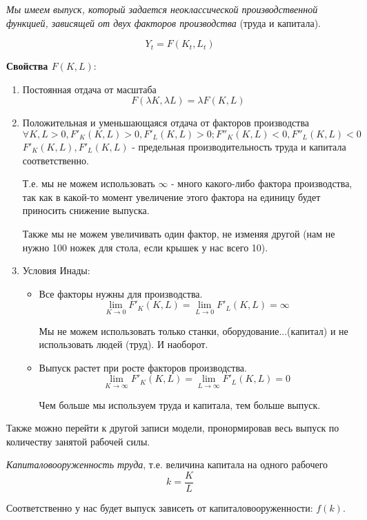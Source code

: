 \documentclass[reqno]{article}
\theoremstyle{definition}
\theoremstyle{definition}
\theoremstyle{definition}
\theoremstyle{definition}
\theoremstyle{definition}
\theoremstyle{definition}
\theoremstyle{definition}
\theoremstyle{definition}
\theoremstyle{definition}
\begin{document}
		\emph{Мы имеем выпуск, который задается неоклассической производственной функцией, зависящей от двух факторов производства} (труда и капитала). 
		
		$$Y_t=F(K_t,L_t)$$
		
		\textbf{Свойства $F(K,L)$}:
		\begin{enumerate}
			\item Постоянная отдача от масштаба 
			$$F(\lambda K, \lambda L) = \lambda F(K, L)$$
			
			\item Положительная и уменьшающаяся отдача от факторов производства
			$$\forall K,L > 0, F'_K (K, L) > 0, F'_L (K, L) > 0; F''_K (K, L) < 0, F''_L (K, L) < 0 $$
			$F'_K (K, L), F'_L (K, L)$ - предельная производительность труда и капитала соответственно.
			
			Т.е. мы не можем использовать $\infty$ - много какого-либо фактора производства, так как в какой-то момент увеличение этого фактора на единицу будет приносить снижение выпуска.
			
			Также мы не можем увеличивать один фактор, не изменяя другой (нам не нужно 100 ножек для стола, если крышек у нас всего 10).
			
			\item Условия Инады:
			\begin{itemize}
				\item Все факторы нужны для производства.
				$$\lim_{K \rightarrow 0} F'_K (K, L) = \lim_{L \rightarrow 0} F'_L (K, L) = \infty$$
				
				Мы не можем использовать только станки, оборудование...(капитал) и не использовать людей (труд). И наоборот.
				
				\item Выпуск растет при росте факторов производства.
				$$\lim_{K \rightarrow \infty} F'_K (K, L) = \lim_{L \rightarrow \infty} F'_L (K, L) = 0$$
				
				Чем больше мы используем труда и капитала, тем больше выпуск.
			\end{itemize}
		\end{enumerate}
		
		Также можно перейти к другой записи модели, пронормировав весь выпуск по количеству занятой рабочей силы.
		
		\emph{Капиталовооруженность труда}, т.е. величина капитала на одного рабочего $$k=\frac{K}{L}$$
		
		Соответственно у нас будет выпуск зависеть от капиталовооруженности: $f(k)$.
		
\end{document}
